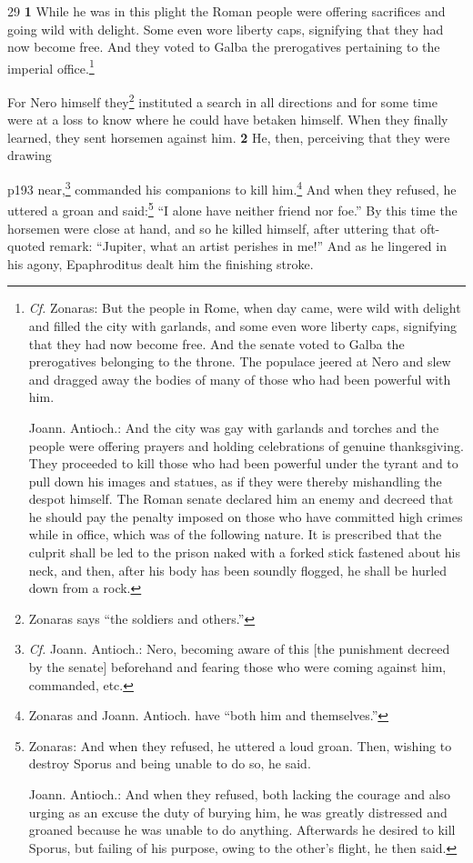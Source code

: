 29
\textbf{1} While he was in this plight the Roman people were offering sacrifices and going wild with delight. Some even wore liberty caps, signifying that they had now become free. And they voted to Galba the prerogatives pertaining to the imperial office.\footnote{\emph{Cf.} Zonaras: But the people in Rome, when day came, were wild with delight and filled the city with garlands, and some even wore liberty caps, signifying that they had now become free. And the senate voted to Galba the prerogatives belonging to the throne. The populace jeered at Nero and slew and dragged away the bodies of many of those who had been power­ful with him.

Joann. Antioch.: And the city was gay with garlands and torches and the people were offering prayers and holding celebrations of genuine thanksgiving. They proceeded to kill those who had been power­ful under the tyrant and to pull down his images and statues, as if they were thereby mishandling the despot himself. The Roman senate declared him an enemy and decreed that he should pay the penalty imposed on those who have committed high crimes while in office, which was of the following nature. It is prescribed that the culprit shall be led to the prison naked with a forked stick fastened about his neck, and then, after his body has been soundly flogged, he shall be hurled down from a rock.

}

For Nero himself they\texthebrew{⁠}\footnote{Zonaras says ``the soldiers and others.''

} instituted a search in all directions and for some time were at a loss to know where he could have betaken himself. When they finally learned, they sent horsemen against him. \textbf{2} He, then, perceiving that they were drawing

p193 near,\texthebrew{⁠}\footnote{\emph{Cf.} Joann. Antioch.: Nero, becoming aware of this [the punishment decreed by the senate] beforehand and fearing those who were coming against him, commanded, etc.

} commanded his companions to kill him.\texthebrew{⁠}\footnote{Zonaras and Joann. Antioch. have ``both him and themselves.''

} And when they refused, he uttered a groan and said:\texthebrew{⁠}\footnote{Zonaras: And when they refused, he uttered a loud groan. Then, wishing to destroy Sporus and being unable to do so, he said.

Joann. Antioch.: And when they refused, both lacking the courage and also urging as an excuse the duty of burying him, he was greatly distressed and groaned because he was unable to do anything. Afterwards he desired to kill Sporus, but failing of his purpose, owing to the other's flight, he then said.

} ``I alone have neither friend nor foe.'' By this time the horsemen were close at hand, and so he killed himself, after uttering that oft-quoted remark: ``Jupiter, what an artist perishes in me!'' And as he lingered in his agony, Epaphroditus dealt him the finishing stroke.

